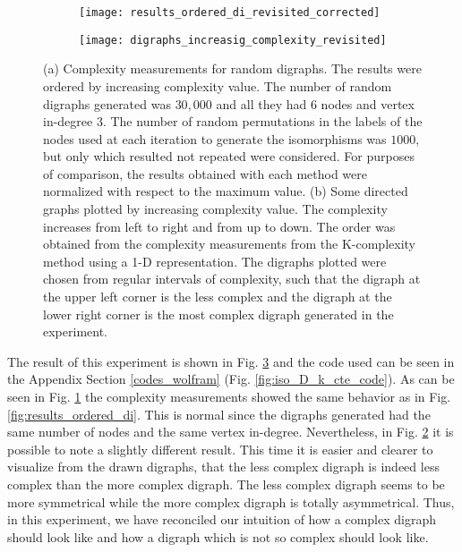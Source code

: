 \begin{figure}
	\centering
	\begin{subfigure}[b]{0.65\textwidth}
		\centering
		\texttt{[image: results\_ordered\_di\_revisited\_corrected]}
		\caption{}
		\label{fig:results_ordered_di_revisited}
	\end{subfigure}
	\hfill
	\begin{subfigure}[b]{0.65\textwidth}
		\centering
		\texttt{[image: digraphs\_increasig\_complexity\_revisited]}
		\caption{}
		\label{fig:digraphs_increasig_complexity_revisited}
	\end{subfigure}
	\caption[Complexity measurements for random digraphs considering its isomorphisms.]{(a) Complexity measurements for random digraphs. The results were ordered by increasing complexity value. The number of random digraphs generated was $30,000$ and all they had $6$ nodes and vertex in-degree $3$. The number of random permutations in the labels of the nodes used at each iteration to generate the isomorphisms was $1000$, but only which resulted not repeated were considered. For purposes of comparison, the results obtained with each method were normalized with respect to the maximum value. (b) Some directed graphs plotted by increasing complexity value. The complexity increases from left to right and from up to down. The order was obtained from the complexity measurements from the K-complexity method using a 1-D representation. The digraphs plotted were chosen from regular intervals of complexity, such that the digraph at the upper left corner is the less complex and the digraph at the lower right corner is the most complex digraph generated in the experiment.}
	\label{fig:digraphs_increasig_complexity_results_revisited}
\end{figure}

The result of this experiment is shown in Fig. \ref{fig:digraphs_increasig_complexity_results_revisited} and the code used can be seen in the Appendix Section \ref{codes_wolfram} (Fig. \ref{fig:iso_D_k_cte_code}). As can be seen in Fig. \ref{fig:results_ordered_di_revisited} the complexity measurements showed the same behavior as in Fig. \ref{fig:results_ordered_di}. This is normal since the digraphs generated had the same number of nodes and the same vertex in-degree. Nevertheless, in Fig. \ref{fig:digraphs_increasig_complexity_revisited} it is possible to note a slightly different result. This time it is easier and clearer to visualize from the drawn digraphs, that the less complex digraph is indeed less complex than the more complex digraph. The less complex digraph seems to be more symmetrical while the more complex digraph is totally asymmetrical. Thus, in this experiment, we have reconciled our intuition of how a complex digraph should look like and how a digraph which is not so complex should look like.\\

